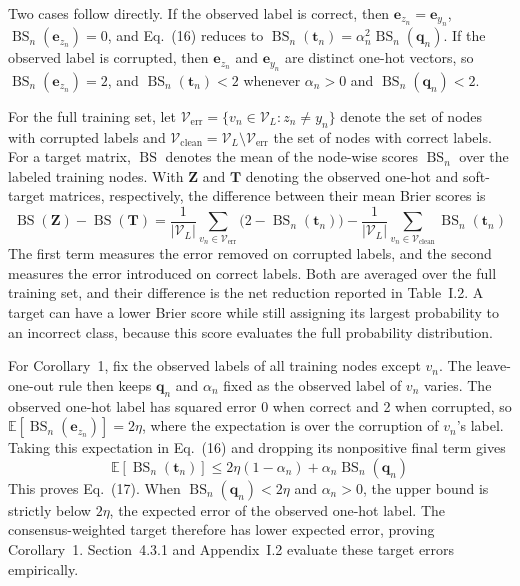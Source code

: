 \documentclass[10pt,letterpaper,nopreprintline]{elsarticle}
\begin{document}
Two cases follow directly. If the observed label is correct, then \(\mathbf e_{z_n}=\mathbf e_{y_n}\), \(\operatorname{BS}_n(\mathbf e_{z_n})=0\), and Eq.~(16) reduces to \(\operatorname{BS}_n(\mathbf t_n)=\alpha_n^2\operatorname{BS}_n(\mathbf q_n)\). If the observed label is corrupted, then \(\mathbf e_{z_n}\) and \(\mathbf e_{y_n}\) are distinct one-hot vectors, so \(\operatorname{BS}_n(\mathbf e_{z_n})=2\), and \(\operatorname{BS}_n(\mathbf t_n)<2\) whenever \(\alpha_n>0\) and \(\operatorname{BS}_n(\mathbf q_n)<2\).

\Needspace{80pt}
For the full training set, let \(\mathcal V_{\mathrm{err}}=\{v_n\in\mathcal V_L:z_n\ne y_n\}\) denote the set of nodes with corrupted labels and \(\mathcal V_{\mathrm{clean}}=\mathcal V_L\setminus\mathcal V_{\mathrm{err}}\) the set of nodes with correct labels. For a target matrix, \(\operatorname{BS}\) denotes the mean of the node-wise scores \(\operatorname{BS}_n\) over the labeled training nodes. With \(\mathbf Z\) and \(\mathbf T\) denoting the observed one-hot and soft-target matrices, respectively, the difference between their mean Brier scores is
\begin{equation}\label{eq:H.5}
\operatorname{BS}(\mathbf Z)-\operatorname{BS}(\mathbf T)
=\frac{1}{|\mathcal V_L|}\sum_{v_n\in\mathcal V_{\mathrm{err}}}\bigl(2-\operatorname{BS}_n(\mathbf t_n)\bigr)
-\frac{1}{|\mathcal V_L|}\sum_{v_n\in\mathcal V_{\mathrm{clean}}}\operatorname{BS}_n(\mathbf t_n)
\end{equation}
The first term measures the error removed on corrupted labels, and the second measures the error introduced on correct labels. Both are averaged over the full training set, and their difference is the net reduction reported in Table~I.2. A target can have a lower Brier score while still assigning its largest probability to an incorrect class, because this score evaluates the full probability distribution.

For Corollary~1, fix the observed labels of all training nodes except \(v_n\). The leave-one-out rule then keeps \(\mathbf q_n\) and \(\alpha_n\) fixed as the observed label of \(v_n\) varies. The observed one-hot label has squared error 0 when correct and 2 when corrupted, so \(\mathbb E[\operatorname{BS}_n(\mathbf e_{z_n})]=2\eta\), where the expectation is over the corruption of \(v_n\)'s label. Taking this expectation in Eq.~(16) and dropping its nonpositive final term gives
\begin{equation}\label{eq:H.6}
\mathbb{E}[\operatorname{BS}_n(\mathbf t_n)]\leq2\eta(1-\alpha_n)+\alpha_n\operatorname{BS}_n(\mathbf q_n)
\end{equation}
This proves Eq.~(17). When \(\operatorname{BS}_n(\mathbf q_n)<2\eta\) and \(\alpha_n>0\), the upper bound is strictly below \(2\eta\), the expected error of the observed one-hot label. The consensus-weighted target therefore has lower expected error, proving Corollary~1. Section~4.3.1 and Appendix~I.2 evaluate these target errors empirically.
\end{document}
